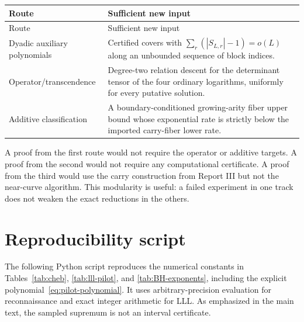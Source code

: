\documentclass[11pt,oneside]{article}
\theoremstyle{definition}
\theoremstyle{remark}
\begin{document}
\begin{longtable}{L{0.25\textwidth}L{0.66\textwidth}}
\toprule
Route & Sufficient new input \\
\midrule
\endfirsthead
\toprule
Route & Sufficient new input \\
\midrule
\endhead
Dyadic auxiliary polynomials & Certified covers with
$\sum_r(|S_{L,r}|-1)=o(L)$ along an unbounded sequence of block indices. \\
Operator/transcendence & Degree-two relation descent for the determinant tensor of the four
ordinary logarithms, uniformly for every putative solution. \\
Additive classification & A boundary-conditioned growing-arity fiber upper bound whose
exponential rate is strictly below the imported carry-fiber lower rate. \\
\bottomrule
\end{longtable}

A proof from the first route would not require the operator or additive targets.  A proof from the
second would not require any computational certificate.  A proof from the third would use the
carry construction from Report III but not the near-curve algorithm.  This modularity is useful:
a failed experiment in one track does not weaken the exact reductions in the others.

\section{Reproducibility script}
\label{app:script}

The following Python script reproduces the numerical constants in
Tables~\ref{tab:cheb}, \ref{tab:lll-pilot}, and \ref{tab:BH-exponents}, including the explicit
polynomial~\eqref{eq:pilot-polynomial}.  It uses arbitrary-precision evaluation for reconnaissance
and exact integer arithmetic for LLL.  As emphasized in the main text, the sampled supremum is not
an interval certificate.
\end{document}
